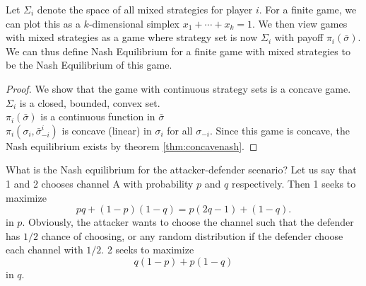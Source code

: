     Let $\Sigma_i$ denote the space of all mixed strategies for player $i$. For a finite game, we can plot this as a $k$-dimensional simplex $x_1+\cdots+x_k=1$. We then view games with mixed strategies as a game where strategy set is now $\Sigma_i$ with payoff $\pi_i(\bar{\sigma})$. 
    We can thus define Nash Equilibrium for a finite game with mixed strategies to be the Nash Equilibrium of this game.
    \begin{proof}
        We show that the game with continuous strategy sets is a concave game. \\
        $\Sigma_i$ is a closed, bounded, convex set.  \\ 
        $\pi_i(\bar\sigma)$ is a continuous function in $\bar{\sigma}$\\
        $\pi_i(\sigma_i,\bar{\sigma}_{-i}^i)$ is concave (linear) in $\sigma_i$ for all $\sigma_{-i}$.
        Since this game is concave, the Nash equilibrium exists by theorem \ref{thm:concavenash}. 
    \end{proof}

    What is the Nash equilibrium for the attacker-defender scenario? Let us say that 1 and 2 chooses channel A with probability $p$ and $q$ respectively.
    Then 1 seeks to maximize \[
    pq+(1-p)(1-q) = p(2q-1)+(1-q).
    \]
    in $p$. Obviously, the attacker wants to choose the channel such that the defender has $1/2$ chance of choosing, or any random distribution if the defender choose each channel with $1/2$.
    2 seeks to maximize \[
        q(1-p)+p(1-q)
        \]
        in $q$.
    \begin{center}
    
        \end{center}
  
